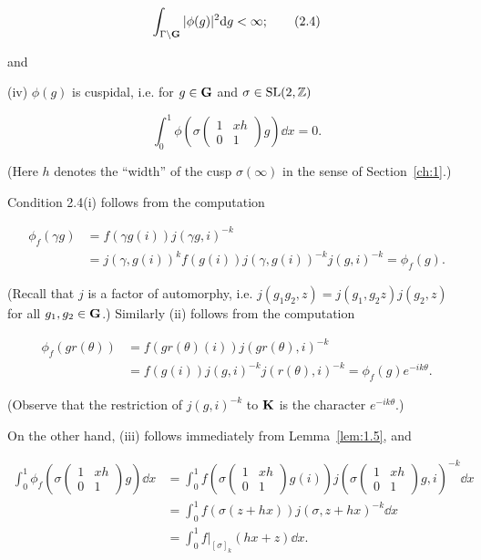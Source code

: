 \begin{equation}\label{eq:2.4}
\int_{\Gamma \setminus \mathbf{G}} |\phi(g)|^2 \mathrm{d} g < \infty;\tag{2.4}
\end{equation}

and

(iv) $\phi(g)$ is cuspidal, i.e. for $g \in \mathbf{G}$ and $\sigma \in \operatorname{SL}(2,\mathbb{Z})$

\[
\int_0^1 \phi\left(\sigma \begin{pmatrix} 1 & xh \\ 0 & 1 \end{pmatrix} g\right) \dd x = 0.
\]

(Here $h$ denotes the ``width'' of the cusp $\sigma(\infty)$ in the sense of Section~\ref{ch:1}.)

Condition 2.4(i) follows from the computation

\[
\begin{aligned}
\phi_f(\gamma g) &= f(\gamma g(i)) j(\gamma g, i)^{-k}\\
&= j(\gamma, g(i))^k f(g(i)) j(\gamma, g(i))^{-k} j(g, i)^{-k} = \phi_f(g).
\end{aligned}
\]

(Recall that $j$ is a factor of automorphy, i.e. $j(g_1g_2, z) = j(g_1, g_2z) j(g_2, z)$ for all $g_1, g_2 \in \mathbf{G}$.) Similarly (ii) follows from the computation

\[
\begin{aligned}
\phi_f(gr(\theta)) &= f(gr(\theta)(i)) j(gr(\theta), i)^{-k}\\
&= f(g(i)) j(g, i)^{-k} j(r(\theta), i)^{-k} = \phi_f(g) e^{-ik\theta}.
\end{aligned}
\]

(Observe that the restriction of $j(g,i)^{-k}$ to $\mathbf{K}$ is the character $e^{-ik\theta}$.)

On the other hand, (iii) follows immediately from Lemma~\ref{lem:1.5}, and

\[
\begin{aligned}
\int_0^1 \phi_f\left(\sigma \begin{pmatrix} 1 & xh \\ 0 & 1 \end{pmatrix} g\right) \dd x &= \int_0^1 f\left(\sigma \begin{pmatrix} 1 & xh \\ 0 & 1 \end{pmatrix} g(i)\right) j\left(\sigma \begin{pmatrix} 1 & xh \\ 0 & 1 \end{pmatrix} g, i\right)^{-k} \dd x\\
&= \int_0^1 f(\sigma(z + hx)) j(\sigma, z + hx)^{-k} \dd x\\
&= \int_0^1 f\big|_{[\sigma]_k}(hx + z) \dd x.
\end{aligned}
\]

